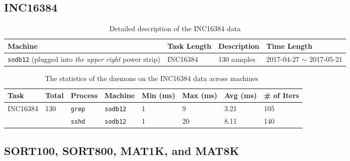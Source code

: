 \documentclass[10pt]{article}
\begin{document}
\subsection{INC16384} 

\begin{table}[h]
\begin{center}
\begin{tabular}{|p{4cm}|p{3cm}|p{4cm}|p{4cm}|} \hline
Machine & Task Length & Description & Time Length\\ \hline
{\tt sodb12} (plugged into {\em the upper right} power strip) & INC16384& 130 samples & 2017-04-27 $\sim$ 2017-05-21\\ \hline
\end{tabular}
\end{center}
\vspace{-.2in}
\caption{Detailed description of the INC16384 data \label{tab:exp_notes16384}}
\end{table}

\begin{table}[htp!]
\centering
{\small
 \begin{tabular}{|l|l|l|l|l||l|l|l|} \hline
 Task & Total & Process & Machine & Min (ms) & Max (ms) & Avg (ms) & \# of Iters\\ \hline
 INC16384 & 130 & {\tt grep} & {\tt sodb12} & 1 & 9 & 3.21& 105 \\ \hline
 \hline
  &  & {\tt sshd} & {\tt sodb12} & 1 & 20 & 8.11 & 140 \\ \hline
 \end{tabular}
  }
 \caption{The statistics of the daemons on the INC16384 data across machines~\label{tab:inc16384}}
\end{table}

\clearpage
\newpage
\subsection{SORT100, SORT800, MAT1K, and MAT8K} 
\end{document}

